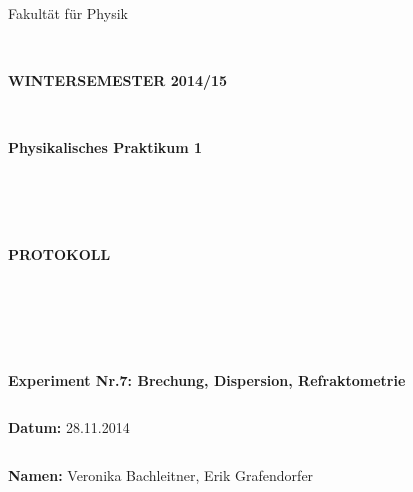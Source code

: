\documentclass{article}
\begin{document}
\thispagestyle{empty}
			\begin{center}
			\Large{Fakultät für Physik}\\
			\end{center}
\begin{verbatim}


\end{verbatim}
			\begin{center}
			\textbf{\LARGE WINTERSEMESTER 2014/15}
			\end{center}
\begin{verbatim}


\end{verbatim}
			\begin{center}
			\textbf{\LARGE{Physikalisches Praktikum 1}}
			\end{center}
\begin{verbatim}




\end{verbatim}

			\begin{center}
			\textbf{\LARGE{PROTOKOLL}}
			\end{center}
			
\begin{verbatim}





\end{verbatim}

			\begin{flushleft}
			\textbf{\Large{Experiment Nr.7:} Brechung, Dispersion, Refraktometrie}\\
			\LARGE{}	
			\end{flushleft}

\begin{verbatim}

\end{verbatim}	
			\begin{flushleft}
			\textbf{\Large{Datum:}} \Large{28.11.2014}
			\end{flushleft}
			
\begin{verbatim}
\end{verbatim}
		\begin{flushleft}
			\textbf{\Large{Namen:}} \Large{Veronika Bachleitner, Erik Grafendorfer}
			\end{flushleft}
\end{document}
